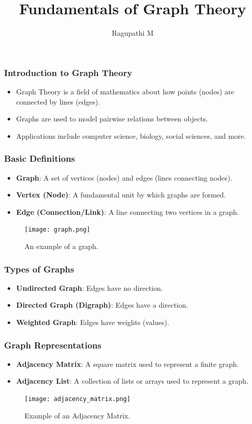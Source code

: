 \documentclass{beamer}
\begin{document}
	
	\begin{frame}
		\title{Fundamentals of Graph Theory}
		\subtitle{}
		\author{Ragupathi M}
		\titlepage
	\end{frame}
	
	\begin{frame}
		\frametitle{Introduction to Graph Theory}
		\begin{itemize}
			\item Graph Theory is a field of mathematics about how points (nodes) are connected by lines (edges).
			\item Graphs are used to model pairwise relations between objects.
			\item Applications include computer science, biology, social sciences, and more.
		\end{itemize}
	\end{frame}
	
	\begin{frame}
		\frametitle{Basic Definitions}
		\begin{itemize}
			\item \textbf{Graph}: A set of vertices (nodes) and edges (lines connecting nodes).
			\item \textbf{Vertex (Node)}: A fundamental unit by which graphs are formed.
			\item \textbf{Edge (Connection/Link)}: A line connecting two vertices in a graph.
		\end{itemize}
		\begin{figure}
			\texttt{[image: graph.png]}
			\caption{An example of a graph.}
		\end{figure}
	\end{frame}
	
	\begin{frame}
		\frametitle{Types of Graphs}
		\begin{itemize}
			\item \textbf{Undirected Graph}: Edges have no direction.
			\item \textbf{Directed Graph (Digraph)}: Edges have a direction.
			\item \textbf{Weighted Graph}: Edges have weights (values).
		\end{itemize}
	\end{frame}
	
	\begin{frame}
		\frametitle{Graph Representations}
		\begin{itemize}
			\item \textbf{Adjacency Matrix}: A square matrix used to represent a finite graph.
			\item \textbf{Adjacency List}: A collection of lists or arrays used to represent a graph.
		\end{itemize}
		\begin{figure}
			\texttt{[image: adjacency\_matrix.png]}
			\caption{Example of an Adjacency Matrix.}
		\end{figure}
	\end{frame}
	
\end{document}
